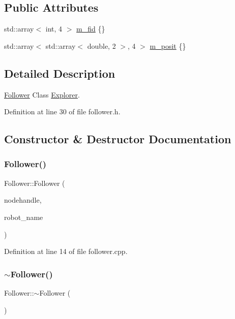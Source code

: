 \subsection*{Public Attributes}
\begin{DoxyCompactItemize}
\item 
std\+::array$<$ int, 4 $>$ \hyperlink{class_follower_a350054bbd7659d493cccc4b4ad9bc460}{m\+\_\+fid} \{\}
\item 
std\+::array$<$ std\+::array$<$ double, 2 $>$, 4 $>$ \hyperlink{class_follower_a6d4e1ebbe79cc8af601d53cba7aeb30a}{m\+\_\+posit} \{\}
\end{DoxyCompactItemize}


\subsection{Detailed Description}
\hyperlink{class_follower}{Follower} Class \hyperlink{class_explorer}{Explorer}. 

Definition at line 30 of file follower.\+h.



\subsection{Constructor \& Destructor Documentation}
\mbox{\label{class_follower_a6870e654b7cc901944ead12870a6b107}} 
\subsubsection{\texorpdfstring{Follower()}{Follower()}}
{\footnotesize\ttfamily Follower\+::\+Follower (\begin{DoxyParamCaption}\item[{ros\+::\+Node\+Handle $\ast$}]{nodehandle,  }\item[{const std\+::string \&}]{robot\+\_\+name }\end{DoxyParamCaption})}



Definition at line 14 of file follower.\+cpp.

\mbox{\label{class_follower_a1dd55289af5ded7a57a2874c5477c33d}} 
\subsubsection{\texorpdfstring{$\sim$\+Follower()}{~Follower()}}
{\footnotesize\ttfamily Follower\+::$\sim$\+Follower (\begin{DoxyParamCaption}{ }\end{DoxyParamCaption})\hspace{0.3cm}{\ttfamily [inline]}}



